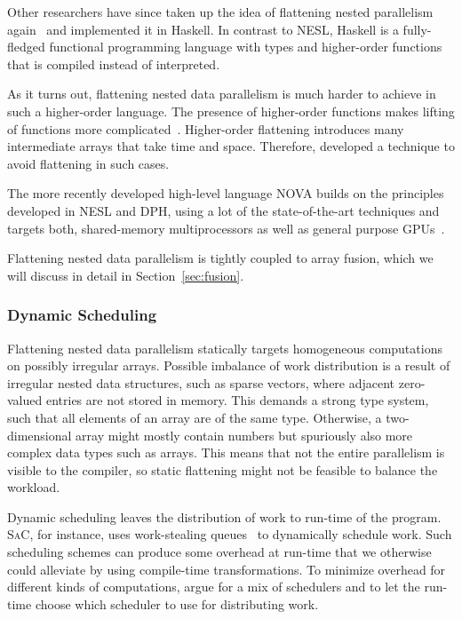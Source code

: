 \documentclass[a4paper]{article}
\newcommand{\sac}{S\textsc{a}C}
\begin{document}
Other researchers have since taken up the idea of flattening nested parallelism again~\cite{Lippmeier:2012:WEH:2364527.2364564} and implemented it in Haskell. In contrast to NESL, Haskell is a fully-fledged functional programming language with types and higher-order functions that is compiled instead of interpreted.

As it turns out, flattening nested data parallelism is much harder to achieve in such a higher-order language. The presence of higher-order functions makes lifting of functions more complicated~\cite{Lippmeier:2012:WEH:2364527.2364564}. Higher-order flattening introduces many intermediate arrays that take time and space. Therefore, \citet{Keller:2012:VA:2364506.2364512} developed a technique to avoid flattening in such cases.

The more recently developed high-level language NOVA builds on the principles developed in NESL and DPH, using a lot of the state-of-the-art techniques and targets both, shared-memory multiprocessors as well as general purpose GPUs~\cite{Collins:2014:NFL:2627373.2627375}.

Flattening nested data parallelism is tightly coupled to array fusion,
which we will discuss in detail in Section~\ref{sec:fusion}.

\subsubsection{Dynamic Scheduling}

Flattening nested data parallelism statically targets homogeneous computations on possibly irregular arrays. Possible imbalance of work distribution is a result of irregular nested data structures, such as sparse vectors, where adjacent zero-valued entries are not stored in memory. This demands a strong type system, such that all elements of an array are of the same type. Otherwise, a two-dimensional array might mostly contain numbers but spuriously also more complex data types such as arrays. This means that not the entire parallelism is visible to the compiler, so static flattening might not be feasible to balance the workload.

Dynamic scheduling leaves the distribution of work to run-time of the program. \sac{}, for instance, uses work-stealing queues~\cite{Chase2005Dynamic, Grelck:2007:SOS:1248648.1248654} to dynamically schedule work. Such scheduling schemes can produce some overhead at run-time that we otherwise could alleviate by using compile-time transformations. To minimize overhead for different kinds of computations, \citet{Fluet:2008:SFG:1411204.1411239} argue for a mix of schedulers and to let the run-time choose which scheduler to use for distributing work.
\end{document}
